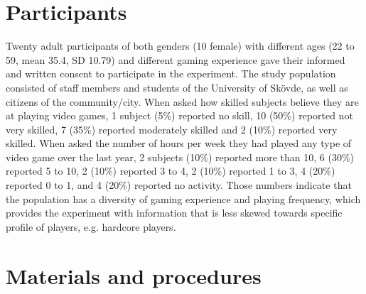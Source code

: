 

\section{Participants}

Twenty adult participants of both genders (10 female) with different ages (22 to 59, mean 35.4, SD 10.79) and different gaming experience gave their informed and written consent to participate in the experiment. The study population consisted of staff members and students of the University of Sk\"ovde, as well as citizens of the community/city. When asked how skilled subjects believe they are at playing video games, 1 subject (5\%) reported no skill, 10 (50\%) reported not very skilled, 7 (35\%) reported moderately skilled and 2 (10\%) reported very skilled. When asked the number of hours per week they had played any type of video game over the last year, 2 subjects (10\%) reported more than 10, 6 (30\%) reported 5 to 10, 2 (10\%) reported 3 to 4, 2 (10\%) reported 1 to 3, 4 (20\%) reported 0 to 1, and 4 (20\%) reported no activity. Those numbers indicate that the population has a diversity of gaming experience and playing frequency, which provides the experiment with information that is less skewed towards specific profile of players, e.g. hardcore players.

\section{Materials and procedures}

